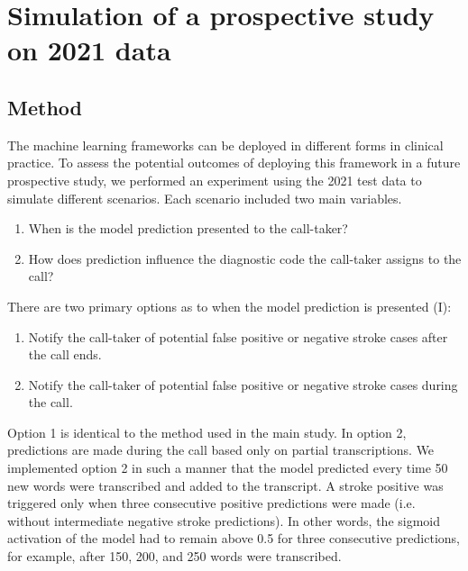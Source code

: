 {\begin{table}
{\begin{tabular}{l|ccccc}
        \bottomrule
    \end{tabular}%
    }
\end{table}


\section{Simulation of a prospective study on 2021 data}

\subsection{Method}

The machine learning frameworks can be deployed in different forms in clinical practice. To assess the potential outcomes of deploying this framework in a future prospective study, we performed an experiment using the 2021 test data to simulate different scenarios. Each scenario included two main variables.
%
\begin{enumerate}[label=\Roman*.]
    \item When is the model prediction presented to the call-taker?
    \item How does prediction influence the diagnostic code the call-taker assigns to the call?
\end{enumerate}
%
There are two primary options as to when the model prediction is presented (I):
%
\begin{enumerate}
    \item Notify the call-taker of potential false positive or negative stroke cases after the call ends.
    \item Notify the call-taker of potential false positive or negative stroke cases during the call.
\end{enumerate}
%
Option 1 is identical to the method used in the main study. In option 2, predictions are made during the call based only on partial transcriptions. We implemented option 2 in such a manner that the model predicted every time 50 new words were transcribed and added to the transcript. A stroke positive was triggered only when three consecutive positive predictions were made (i.e. without intermediate negative stroke predictions). In other words, the sigmoid activation of the model had to remain above 0.5 for three consecutive predictions, for example, after 150, 200, and 250 words were transcribed.

}
